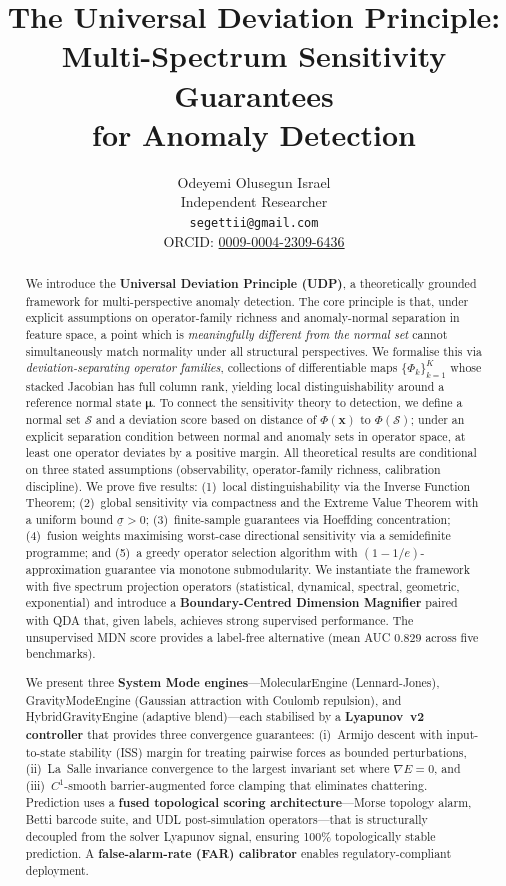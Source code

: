 \documentclass{article}
\title{The Universal Deviation Principle: Multi-Spectrum Sensitivity Guarantees\\for Anomaly Detection}
\author{
  Odeyemi Olusegun Israel \\
  Independent Researcher \\
  \texttt{segettii@gmail.com} \\
  ORCID: \href{https://orcid.org/0009-0004-2309-6436}{0009-0004-2309-6436}
}
\newcommand{\Nset}{\mathcal{S}}  %
\begin{document}
\maketitle

\begin{abstract}
We introduce the \textbf{Universal Deviation Principle (UDP)}, a theoretically grounded framework for multi-perspective anomaly detection. The core principle is that, under explicit assumptions on operator-family richness and anomaly-normal separation in feature space, a point which is \emph{meaningfully different from the normal set} cannot simultaneously match normality under all structural perspectives. We formalise this via \emph{deviation-separating operator families}, collections of differentiable maps $\{\Phi_k\}_{k=1}^K$ whose stacked Jacobian has full column rank, yielding local distinguishability around a reference normal state $\bm{\mu}$. To connect the sensitivity theory to detection, we define a normal set $\Nset$ and a deviation score based on distance of $\Phi(\mathbf{x})$ to $\Phi(\Nset)$; under an explicit separation condition between normal and anomaly sets in operator space, at least one operator deviates by a positive margin. All theoretical results are conditional on three stated assumptions (observability, operator-family richness, calibration discipline). We prove five results: (1)~local distinguishability via the Inverse Function Theorem; (2)~global sensitivity via compactness and the Extreme Value Theorem with a uniform bound $\underline{\sigma} > 0$; (3)~finite-sample guarantees via Hoeffding concentration; (4)~fusion weights maximising worst-case directional sensitivity via a semidefinite programme; and (5)~a greedy operator selection algorithm with $(1-1/e)$-approximation guarantee via monotone submodularity. We instantiate the framework with five spectrum projection operators (statistical, dynamical, spectral, geometric, exponential) and introduce a \textbf{Boundary-Centred Dimension Magnifier} paired with QDA that, given labels, achieves strong supervised performance. The unsupervised MDN score provides a label-free alternative (mean AUC $0.829$ across five benchmarks).

We present three \textbf{System Mode engines}---MolecularEngine (Lennard-Jones), GravityModeEngine (Gaussian attraction with Coulomb repulsion), and HybridGravityEngine (adaptive blend)---each stabilised by a \textbf{Lyapunov~v2 controller} that provides three convergence guarantees: (i)~Armijo descent with input-to-state stability (ISS) margin for treating pairwise forces as bounded perturbations, (ii)~La~Salle invariance convergence to the largest invariant set where $\nabla E = 0$, and (iii)~$C^1$-smooth barrier-augmented force clamping that eliminates chattering. Prediction uses a \textbf{fused topological scoring architecture}---Morse topology alarm, Betti barcode suite, and UDL post-simulation operators---that is structurally decoupled from the solver Lyapunov signal, ensuring 100\% topologically stable prediction. A \textbf{false-alarm-rate (FAR) calibrator} enables regulatory-compliant deployment.


\end{abstract}
\end{document}
